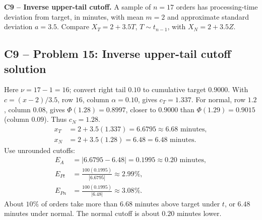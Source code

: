 {
\textbf{C9 -- Inverse upper-tail cutoff.} A sample of $n=17$ orders has processing-time deviation from target, in minutes, with mean $m=2$ and approximate standard deviation $a=3.5$. Compare $X_T=2+3.5T$, $T\sim t_{n-1}$, with $X_N=2+3.5Z$.
\label{sol:q15}
\subsection*{C9 -- Problem 15: Inverse upper-tail cutoff solution }
Here $\nu=17-1=16$; convert right tail $0.10$ to cumulative target $0.9000$.
With $c=(x-2)/3.5$, row $16$, column $\alpha=0.10$, gives $c_T=1.337$.
For normal, row $1.2$, column $0.08$, gives $\Phi(1.28)=0.8997$, closer to $0.9000$ than $\Phi(1.29)=0.9015$ (column $0.09$).
Thus $c_N=1.28$.
\[
 \begin{aligned}
 x_T&=2+3.5(1.337)=6.6795\approx\boxed{6.68\text{ minutes}},\\
 x_N&=2+3.5(1.28)=6.48=\boxed{6.48\text{ minutes}}.
 \end{aligned}
\]
Use unrounded cutoffs:
\[
 \begin{aligned}
 E_A&=|6.6795-6.48|=0.1995\approx\boxed{0.20\text{ minutes}},\\
 E_{Pt}&=\frac{100(0.1995)}{|6.6795|}\approx\boxed{2.99\%},\\
 E_{Pn}&=\frac{100(0.1995)}{|6.48|}\approx\boxed{3.08\%}.
 \end{aligned}
\]
About $10\%$ of orders take more than $6.68$ minutes above target under $t$, or $6.48$ minutes under normal.
The normal cutoff is about $0.20$ minutes lower.
\secInicio[sec:q15]
}

